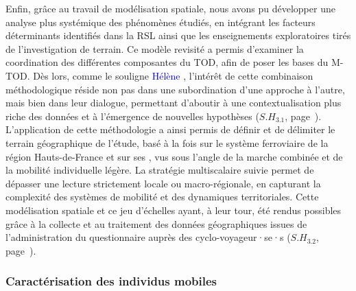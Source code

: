 \begin{refsegment}
Enfin, grâce au travail de modélisation spatiale, nous avons pu développer une analyse plus systémique des phénomènes étudiés, en intégrant les facteurs déterminants identifiés dans la \acrfull{RSL} ainsi que les enseignements exploratoires tirés de l’investigation de terrain. Ce modèle revisité a permis d’examiner la coordination des différentes composantes du \acrshort{TOD}, afin de poser les bases du \acrshort{M-TOD}. Dès lors, comme le souligne \textcolor{blue}{Hélène} \textcolor{blue}{\textcite{nessi_traduire_2022}}, l’intérêt de cette combinaison méthodologique réside non pas dans une subordination d’une approche à l’autre, mais bien dans leur dialogue, permettant d’aboutir à une contextualisation plus riche des données et à l’émergence de nouvelles hypothèses (\hyperref[sous-hypothese-3.1]{\(S.H_{3.1}\)}, page~\pageref{sous-hypothese-3.1}). L’application de cette méthodologie a ainsi permis de définir et de délimiter le terrain géographique de l’étude, basé à la fois sur le système ferroviaire de la région Hauts-de-France et sur ses , vus sous l’angle de la marche combinée et de la mobilité individuelle légère. La stratégie multiscalaire suivie permet de dépasser une lecture strictement locale ou macro-régionale, en capturant la complexité des systèmes de mobilité et des dynamiques territoriales. Cette modélisation spatiale et ce jeu d’échelles ayant, à leur tour, été rendus possibles grâce à la collecte et au traitement des données géographiques issues de l’administration du questionnaire auprès des cyclo-voyageur·se·s (\hyperref[sous-hypothese-3.2]{\(S.H_{3.2}\)}, page~\pageref{sous-hypothese-3.2}).%

\subsubsection*{Caractérisation des individus mobiles
    \label{conclusion-generale:principaux-apports-chapitre4}
    }


\end{refsegment}

